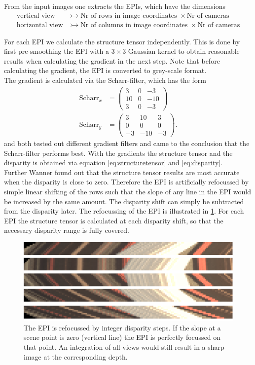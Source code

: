 \documentclass  [
  paper    = a4,
  BCOR     = 10mm,
  twoside,
  fontsize = 12pt,
  fleqn,
  toc      = bibnumbered,
  toc      = listofnumbered,
  numbers  = noendperiod,
  headings = normal,
  listof   = leveldown,
  version  = 3.03
]                                       {scrreprt}
\begin{document}
 From the input images one extracts the EPIs, which have the dimensions
 \begin{align*}
 \text{vertical view}&\rightarrowtail \text{Nr of rows in image coordinates }\times \text{Nr of cameras}\\
 \text{horizontal view}&\rightarrowtail \text{Nr of columns in image coordinates }\times \text{Nr of cameras}
 \end{align*}
 
 For each EPI we calculate the structure tensor independently. This is done by first pre-smoothing the EPI with a $3\times3$ Gaussian kernel to obtain reasonable results when calculating the gradient in the next step. Note that before calculating the gradient, the EPI is converted to grey-scale format.\\
 The gradient is calculated via the Scharr-filter, which has the form
 \begin{align}\label{key}
 \text{Scharr}_x &= \left(\begin{matrix}
 3&0&-3\\
 10&0&-10\\
 3&0&-3
 \end{matrix}\right)
\\
 \text{Scharr}_y &= \left(\begin{matrix}
 3&10&3\\
 0&0&0\\
 -3&-10&-3
 \end{matrix}\right).
 \end{align}
 \cite{wanner2014orientation} and \cite{diebold2016light} both tested out different gradient filters and came to the conclusion that the Scharr-filter performs best. With the gradients the structure tensor and the disparity is obtained via equation \ref{eq:structuretensor} and \ref{eq:disparity}.\\
 Further Wanner found out that the structure tensor results are most accurate when the disparity is close to zero. Therefore the EPI is artificially refocussed by simple linear shifting of the rows such that the slope of any line in the EPI would be increased by the same amount. The disparity shift can simply be subtracted from the disparity later. The refocussing of the EPI is illustrated in \ref{fig:refocusedcut}. For each EPI the structure tensor is calculated at each disparity shift, so that the necessary disparity range is fully covered.  \\
 \begin{figure}
 	\centering
 	\includegraphics[width=0.7\linewidth]{images/refocused_cut}
 	\caption[Refocussed EPI]{The EPI is refocussed by integer disparity steps. If the slope at a scene point is zero (vertical line) the EPI is perfectly focussed on that point. An integration of all views would still result in a sharp image at the corresponding depth.}
 	\label{fig:refocusedcut}
 \end{figure}
 
\end{document}
